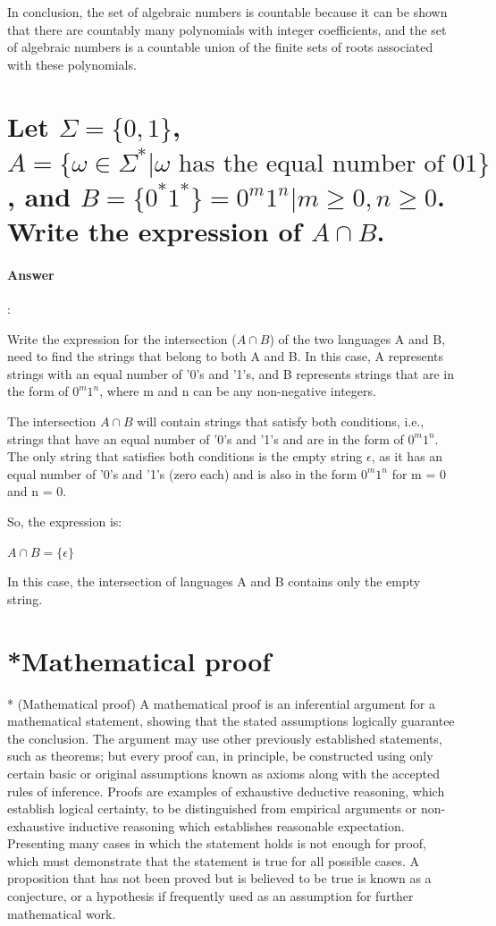 \documentclass{article}
\begin{document}
In conclusion, the set of algebraic numbers is countable because it can be shown that there are countably many polynomials with integer coefficients, and the set of algebraic numbers is a countable union of the finite sets of roots associated with these polynomials.

\section{Let $\Sigma = \{0, 1\}$, $A = \{\omega \in \Sigma ^* | \omega \text{ has the equal number of 01}\}$, and $B = \{0^*1^*\} = {0^m1^n | m \geq 0, n \geq 0}$. Write the expression of $A \cap  B$.}

\paragraph{Answer}:

Write the expression for the intersection ($A \cap B$) of the two languages A and B, need to find the strings that belong to both A and B. In this case, A represents strings with an equal number of '0's and '1's, and B represents strings that are in the form of $0^m1^n$, where m and n can be any non-negative integers.

The intersection $A \cap B$ will contain strings that satisfy both conditions, i.e., strings that have an equal number of '0's and '1's and are in the form of $0^m1^n$. The only string that satisfies both conditions is the empty string $\epsilon$, as it has an equal number of '0's and '1's (zero each) and is also in the form $0^m1^n$ for m = 0 and n = 0.

So, the expression is:

$A \cap  B = \{\epsilon\}$

In this case, the intersection of languages A and B contains only the empty string.

\section{*Mathematical proof}

* (Mathematical proof) A mathematical proof is an inferential argument for a mathematical statement, showing that the stated assumptions logically guarantee the conclusion. The argument may use other previously established statements, such as theorems; but every proof can, in principle, be constructed using only certain basic or original assumptions known as axioms along with the accepted rules of inference. Proofs are examples of exhaustive deductive reasoning, which establish logical certainty, to be distinguished from empirical arguments or non-exhaustive inductive reasoning which establishes reasonable expectation. Presenting many cases in
which the statement holds is not enough for proof, which must demonstrate that the statement is true for all possible cases. A proposition that has not been proved but is believed to be true is known as a conjecture, or a hypothesis if frequently used as an assumption for further mathematical work.
\end{document}
